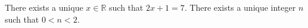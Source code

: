 There exists a unique $x \in \mathbb{R}$ such that $2x + 1 = 7$.
There exists a unique integer $n$ such that $0 < n < 2$.